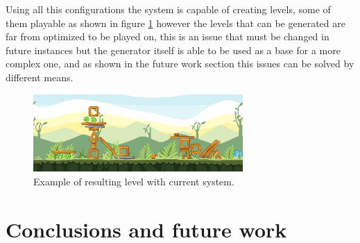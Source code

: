 \documentclass[conference]{IEEEtran}
\begin{document}
    Using all this configurations the system is capable of creating levels, some of
    them playable as shown in figure \ref{result_1} however the levels that can be
    generated are far from optimized to be played on, this is an issue that must be
    changed in future instances but the generator itself is able to be used as a
    base for a more complex one, and as shown in the future work section this issues
    can be solved by different means.
    
    \begin{figure}[htbp]
        \centerline{\includegraphics[width=80mm]{Images/Result_n2.png}}
        \caption{Example of resulting level with current system.}
        \label{result_1}
    \end{figure}
    
    \section{Conclusions and future work}
    
\end{document}
